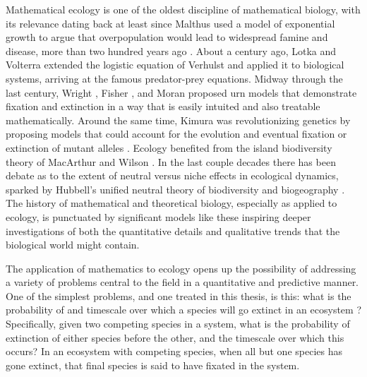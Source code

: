 Mathematical ecology is one of the oldest discipline of mathematical biology, with its relevance dating back at least since Malthus used a model of exponential growth to argue that overpopulation would lead to widespread famine and disease, more than two hundred years ago \cite{Malthus1798}. %
About a century ago, Lotka \cite{Lotka1920} and Volterra \cite{Volterra1926} extended the logistic equation of Verhulst \cite{Verhulst1838} and applied it to biological systems, arriving at the famous predator-prey equations. 
Midway through the last century, Wright \cite{Wright1931}, Fisher \cite{Fisher1930}, and Moran \cite{Moran1962} proposed urn models that demonstrate fixation and extinction in a way that is easily intuited and also treatable mathematically. 
Around the same time, Kimura was revolutionizing genetics by proposing models that could account for the evolution and eventual fixation or extinction of mutant alleles \cite{Crow1956,Kimura1964}. 
Ecology benefited from the island biodiversity theory of MacArthur and Wilson \cite{MacArthur1967}. %
In the last couple decades there has been debate as to the extent of neutral versus niche effects in ecological dynamics, sparked by Hubbell's unified neutral theory of biodiversity and biogeography \cite{Hubbell2001}. 
The history of mathematical and theoretical biology, especially as applied to ecology, is punctuated by significant models like these inspiring deeper investigations of both the quantitative details and qualitative trends that the biological world might contain. 

The application of mathematics to ecology opens up the possibility of addressing a variety of problems central to the field in a quantitative and predictive manner. 
One of the simplest problems, and one treated in this thesis, is this: what is the probability of and timescale over which a species will go extinct in an ecosystem \cite{Badali2019a,Badali2019b}? 
Specifically, given two competing species in a system, what is the probability of extinction of either species before the other, and the timescale over which this occurs? 
In an ecosystem with competing species, when all but one species has gone extinct, that final species is said to have fixated in the system. 

